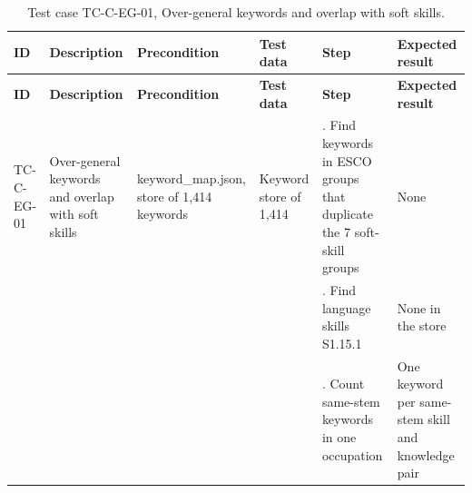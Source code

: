 {\footnotesize{}\renewcommand{\arraystretch}{1.1}
\begin{longtable}{|>{\raggedright\arraybackslash}p{}|>{\raggedright\arraybackslash}p{}|>{\raggedright\arraybackslash}p{}|>{\raggedright\arraybackslash}p{}|>{\raggedright\arraybackslash}p{}|>{\raggedright\arraybackslash}p{}|}
\caption{Test case TC-C-EG-01, Over-\allowbreak{}general keywords and overlap with soft skills.} \\
\hline
\textbf{ID} & \textbf{Description} & \textbf{Precondition} & \textbf{Test data} & \textbf{Step} & \textbf{Expected result} \\ \hline
\endfirsthead
\hline
\textbf{ID} & \textbf{Description} & \textbf{Precondition} & \textbf{Test data} & \textbf{Step} & \textbf{Expected result} \\ \hline
\endhead
TC-C-EG-01 & Over-\allowbreak{}general keywords and overlap with soft skills & keyword\_\allowbreak{}map.\allowbreak{}json, store of 1,414 keywords & Keyword store of 1,414 & 1. Find keywords in ESCO groups that duplicate the 7 soft-skill groups & None \\ \cline{5-6}
 &  &  &  & 2. Find language skills S1.15.1 & None in the store \\ \cline{5-6}
 &  &  &  & 3. Count same-stem keywords in one occupation & One keyword per same-stem skill and knowledge pair \\ \hline
\end{longtable}
}

